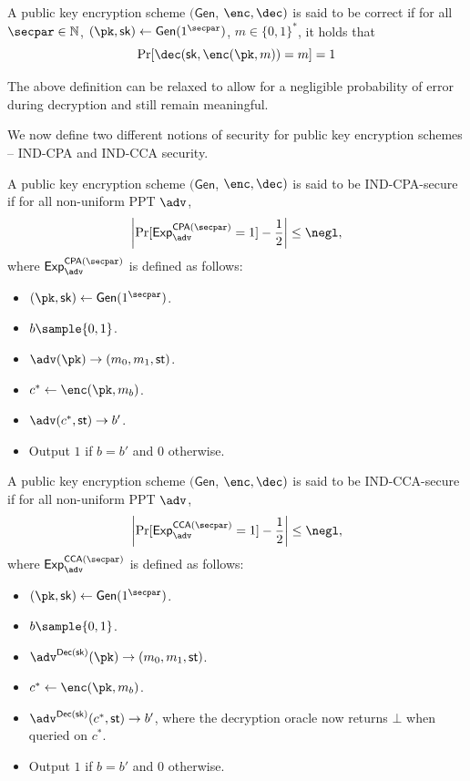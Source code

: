 \documentclass[12pt]{tufte-book}
\newcommand{\gen}{\mathsf{Gen}}
\newcommand{\Dec}{\mathsf{Dec}}
\begin{document}
\begin{definition}
    A public key encryption scheme $(\gen$, $\enc, \dec)$ is said to be correct if for all $\secpar \in \mathbb{N}$, $(\pk, \sk) \gets \gen(1^\secpar)$, $m \in \{0,1\}^*$, it holds that
    \[\Pr[\dec(\sk, \enc(\pk, m)) = m] = 1\]
\end{definition}
The above definition can be relaxed to allow for a negligible probability of error during decryption and still remain meaningful.

We now define two different notions of security for public key encryption schemes -- IND-CPA and IND-CCA security.
\begin{definition}
    A public key encryption scheme $(\gen$, $\enc, \dec)$ is said to be IND-CPA-secure if for all non-uniform PPT $\adv$,
    \[\left|\Pr[\mathsf{Exp}_{\adv}^{\mathsf{CPA}(\secpar)} = 1] - \frac{1}{2}\right| \leq \negl,\]
    where $\mathsf{Exp}_{\adv}^{\mathsf{CPA}(\secpar)}$ is defined as follows:
    \begin{itemize}
        \item $(\pk, \sk) \gets \gen(1^\secpar)$.
        \item $b \sample \{0,1\}$.
        \item $\adv(\pk) \to (m_0, m_1, \mathsf{st})$.
        \item $c^* \gets \enc(\pk, m_b)$.
        \item $\adv(c^*, \mathsf{st}) \to b'$.
        \item Output $1$ if $b = b'$ and $0$ otherwise.
    \end{itemize}
\end{definition}

\begin{definition}
    A public key encryption scheme $(\gen$, $\enc, \dec)$ is said to be IND-CCA-secure if for all non-uniform PPT $\adv$,
    \[\left|\Pr[\mathsf{Exp}_{\adv}^{\mathsf{CCA}(\secpar)} = 1] - \frac{1}{2}\right| \leq \negl,\]
    where $\mathsf{Exp}_{\adv}^{\mathsf{CCA}(\secpar)}$ is defined as follows:
    \begin{itemize}
        \item $(\pk, \sk) \gets \gen(1^\secpar)$.
        \item $b \sample \{0,1\}$.
        \item $\adv^{\Dec(\sk)}(\pk) \to (m_0, m_1, \mathsf{st})$.
        \item $c^* \gets \enc(\pk, m_b)$.
        \item $\adv^{\Dec(\sk)}(c^*, \mathsf{st}) \to b'$, where the decryption oracle now returns $\bot$ when queried on $c^*$.
        \item Output $1$ if $b = b'$ and $0$ otherwise.
    \end{itemize}
\end{definition}
\end{document}
